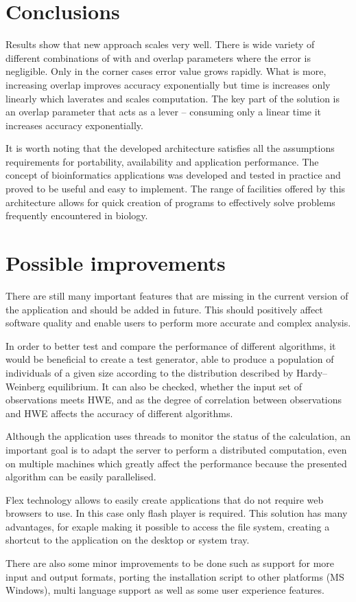 \documentclass[]{spie}
\begin{document}
\section{Conclusions}

Results show that new approach scales very well.
There is wide variety of different combinations of with and overlap parameters where the error is negligible.
Only in the corner cases error value grows rapidly.
What is more, increasing overlap improves accuracy exponentially but time is increases only linearly which laverates and scales computation.
The key part of the solution is an overlap parameter that acts as a lever -- consuming only a linear time it increases accuracy exponentially. 


It is worth noting that the developed architecture satisfies all the assumptions requirements for portability, availability and application performance. 
The concept of bioinformatics applications was developed and tested in practice and proved to be useful and easy to implement. 
The range of facilities offered by this architecture allows for quick creation of programs to effectively solve problems frequently encountered in biology.
\section{Possible improvements}

There are still many important features that are missing in the current version of the application and should be added in future.
This should positively affect software quality and enable users to perform more accurate and complex analysis.

In order to better test and compare the performance of different algorithms, it would be beneficial to create a test generator, able to produce a population of individuals of a given size according to the distribution described by Hardy--Weinberg equilibrium.
It can also be checked, whether the input set of observations meets HWE, and as the degree of correlation between observations and HWE affects the accuracy of different algorithms.

Although the application uses threads to monitor the status of the calculation, an important goal is to adapt the server to perform a distributed computation, even on multiple machines which greatly affect the performance because the presented algorithm can be easily parallelised.

Flex technology allows to easily create applications that do not require web browsers to use. In this case only flash player is required. This solution has many advantages, for exaple making it possible to access the file system, creating a shortcut to the application on the desktop or system tray.

There are also some minor improvements to be done such as support for more input and output formats, porting the installation script to other platforms (MS Windows), multi language support as well as some user experience features.


\end{document}
